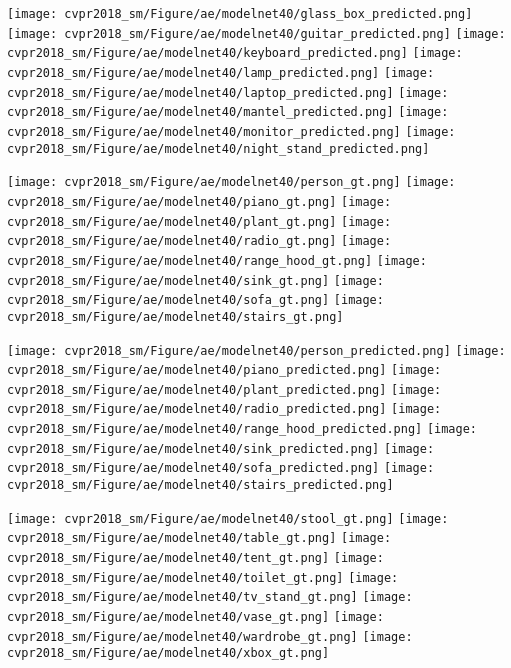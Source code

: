 \documentclass[10pt,twocolumn,letterpaper]{article}
\begin{document}
\begin{figure*}[t]
        \texttt{[image: cvpr2018\_sm/Figure/ae/modelnet40/glass\_box\_predicted.png]}
        \texttt{[image: cvpr2018\_sm/Figure/ae/modelnet40/guitar\_predicted.png]}
        \texttt{[image: cvpr2018\_sm/Figure/ae/modelnet40/keyboard\_predicted.png]}
        \texttt{[image: cvpr2018\_sm/Figure/ae/modelnet40/lamp\_predicted.png]}
        \texttt{[image: cvpr2018\_sm/Figure/ae/modelnet40/laptop\_predicted.png]}
        \texttt{[image: cvpr2018\_sm/Figure/ae/modelnet40/mantel\_predicted.png]}
        \texttt{[image: cvpr2018\_sm/Figure/ae/modelnet40/monitor\_predicted.png]}
        \texttt{[image: cvpr2018\_sm/Figure/ae/modelnet40/night\_stand\_predicted.png]}
        
        \texttt{[image: cvpr2018\_sm/Figure/ae/modelnet40/person\_gt.png]}
        \texttt{[image: cvpr2018\_sm/Figure/ae/modelnet40/piano\_gt.png]}
        \texttt{[image: cvpr2018\_sm/Figure/ae/modelnet40/plant\_gt.png]}
        \texttt{[image: cvpr2018\_sm/Figure/ae/modelnet40/radio\_gt.png]}
        \texttt{[image: cvpr2018\_sm/Figure/ae/modelnet40/range\_hood\_gt.png]}
        \texttt{[image: cvpr2018\_sm/Figure/ae/modelnet40/sink\_gt.png]}
        \texttt{[image: cvpr2018\_sm/Figure/ae/modelnet40/sofa\_gt.png]}
        \texttt{[image: cvpr2018\_sm/Figure/ae/modelnet40/stairs\_gt.png]}
        
        \texttt{[image: cvpr2018\_sm/Figure/ae/modelnet40/person\_predicted.png]}
        \texttt{[image: cvpr2018\_sm/Figure/ae/modelnet40/piano\_predicted.png]}
        \texttt{[image: cvpr2018\_sm/Figure/ae/modelnet40/plant\_predicted.png]}
        \texttt{[image: cvpr2018\_sm/Figure/ae/modelnet40/radio\_predicted.png]}
        \texttt{[image: cvpr2018\_sm/Figure/ae/modelnet40/range\_hood\_predicted.png]}
        \texttt{[image: cvpr2018\_sm/Figure/ae/modelnet40/sink\_predicted.png]}
        \texttt{[image: cvpr2018\_sm/Figure/ae/modelnet40/sofa\_predicted.png]}
        \texttt{[image: cvpr2018\_sm/Figure/ae/modelnet40/stairs\_predicted.png]}
        
        \texttt{[image: cvpr2018\_sm/Figure/ae/modelnet40/stool\_gt.png]}
        \texttt{[image: cvpr2018\_sm/Figure/ae/modelnet40/table\_gt.png]}
        \texttt{[image: cvpr2018\_sm/Figure/ae/modelnet40/tent\_gt.png]}
        \texttt{[image: cvpr2018\_sm/Figure/ae/modelnet40/toilet\_gt.png]}
        \texttt{[image: cvpr2018\_sm/Figure/ae/modelnet40/tv\_stand\_gt.png]}
        \texttt{[image: cvpr2018\_sm/Figure/ae/modelnet40/vase\_gt.png]}
        \texttt{[image: cvpr2018\_sm/Figure/ae/modelnet40/wardrobe\_gt.png]}
        \texttt{[image: cvpr2018\_sm/Figure/ae/modelnet40/xbox\_gt.png]}
        

\end{figure*}
\end{document}
